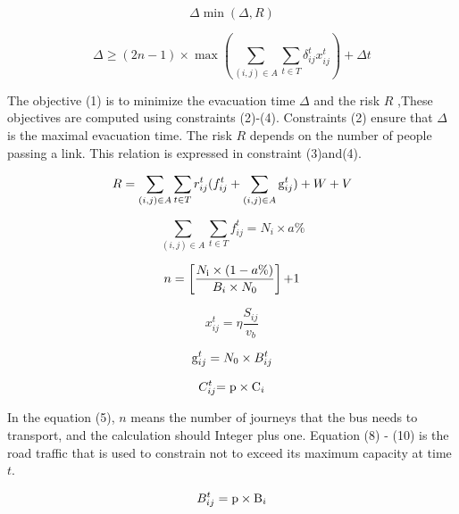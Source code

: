 \documentclass{mcmthesis}
\begin{document}
\begin{equation}\label{3}
\Delta \min (\Delta ,R)
\end{equation}

\begin{equation}\label{4}
\Delta  \ge (2n - 1) \times \max (\sum\limits_{(i,j) \in A} {\sum\limits_{t \in T} {\delta _{ij}^tx_{ij}^t} } ) + \Delta t
\end{equation}

The objective (1) is to minimize the evacuation time $\Delta $ and the risk $R$ ,These objectives are computed using constraints (2)-(4). Constraints (2) ensure that $\Delta $ is the maximal evacuation time. The risk $R$ depends on the number of people passing a link. This relation is expressed in constraint (3)and(4).

\begin{equation}\label{5}
 R = \sum\limits_{(i,j) \in A} {\sum\limits_{t \in T} {r_{ij}^t} } (f_{ij}^t + \sum\limits_{(i,j) \in A} {{\rm{g}}_{ij}^t} ) + W + V
\end{equation}

\begin{equation}\label{6}
\sum\limits_{(i,j) \in A} {\sum\limits_{t \in T} {f_{ij}^t} }  = {N_i} \times a\%
\end{equation}

\begin{equation}\label{7}
n = \left[ {\frac{{{N_{\rm{i}}} \times (1 - a\% )}}{{{B_i} \times {N_0}}}} \right]{\rm{ + }}1
\end{equation}

\begin{equation}\label{8}
x_{ij}^t = \eta \frac{{{S_{ij}}}}{{{v_b}}}
\end{equation}

\begin{equation}\label{9}
{\rm{g}}_{ij}^t = {N_0} \times B_{ij}^t
\end{equation}

\begin{equation}\label{10}
C_{ij}^t{\rm{ = p}} \times {{\rm{C}}_i}
\end{equation}

In the equation (5), $n$ means the number of journeys that the bus needs to transport, and the calculation should Integer plus one. Equation (8) - (10) is the road traffic that is used to constrain not to exceed its maximum capacity at time $t$.

\begin{equation}\label{11}
B_{ij}^t = {\rm{p}} \times {{\rm{B}}_i}
\end{equation}
\end{document}
